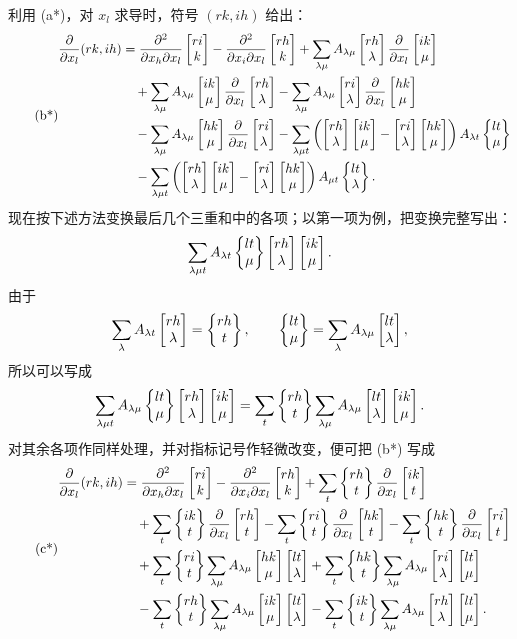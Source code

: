 利用 (a*)，对 \(x_l\) 求导时，符号 \((rk,ih)\) 给出：
\begin{equation}\tag{b*}
\begin{aligned}
\frac{\partial}{\partial x_l}(rk,ih)&=
 \frac{\partial^2}{\partial x_h\partial x_l}\chrsqB{ri}{k}
 -\frac{\partial^2}{\partial x_i\partial x_l}\chrsqB{rh}{k}
 +\sum_{\lambda\mu}A_{\lambda\mu}\chrsqB{rh}{\lambda}\frac{\partial}{\partial x_l}\chrsqB{ik}{\mu}\\
&\quad+\sum_{\lambda\mu}A_{\lambda\mu}\chrsqB{ik}{\mu}\frac{\partial}{\partial x_l}\chrsqB{rh}{\lambda}
 -\sum_{\lambda\mu}A_{\lambda\mu}\chrsqB{ri}{\lambda}\frac{\partial}{\partial x_l}\chrsqB{hk}{\mu}\\
&\quad-\sum_{\lambda\mu}A_{\lambda\mu}\chrsqB{hk}{\mu}\frac{\partial}{\partial x_l}\chrsqB{ri}{\lambda}
 -\sum_{\lambda\mu t}\left(\chrsqB{rh}{\lambda}\chrsqB{ik}{\mu}
 -\chrsqB{ri}{\lambda}\chrsqB{hk}{\mu}\right)A_{\lambda t}\chrB{lt}{\mu}\\
&\quad-\sum_{\lambda\mu t}\left(\chrsqB{rh}{\lambda}\chrsqB{ik}{\mu}
 -\chrsqB{ri}{\lambda}\chrsqB{hk}{\mu}\right)A_{\mu t}\chrB{lt}{\lambda}.
\end{aligned}
\end{equation}
现在按下述方法变换最后几个三重和中的各项；以第一项为例，把变换完整写出：
\[
 \sum_{\lambda\mu t}A_{\lambda t}\chrB{lt}{\mu}\chrsqB{rh}{\lambda}\chrsqB{ik}{\mu}.
\]
由于
\[
 \sum_\lambda A_{\lambda t}\chrsqB{rh}{\lambda}=\chrB{rh}{t},
 \qquad
 \chrB{lt}{\mu}=\sum_\lambda A_{\lambda\mu}\chrsqB{lt}{\lambda},
\]
所以可以写成
\[
 \sum_{\lambda\mu t}A_{\lambda\mu}\chrB{lt}{\mu}\chrsqB{rh}{\lambda}\chrsqB{ik}{\mu}
 =\sum_t\chrB{rh}{t}\sum_{\lambda\mu}A_{\lambda\mu}\chrsqB{lt}{\lambda}\chrsqB{ik}{\mu}.
\]
对其余各项作同样处理，并对指标记号作轻微改变，便可把 (b*) 写成
\begin{equation}\tag{c*}
\begin{aligned}
\frac{\partial}{\partial x_l}(rk,ih)&=
 \frac{\partial^2}{\partial x_h\partial x_l}\chrsqB{ri}{k}
 -\frac{\partial^2}{\partial x_i\partial x_l}\chrsqB{rh}{k}
 +\sum_t\chrB{rh}{t}\frac{\partial}{\partial x_l}\chrsqB{ik}{t}\\
&\quad+\sum_t\chrB{ik}{t}\frac{\partial}{\partial x_l}\chrsqB{rh}{t}
 -\sum_t\chrB{ri}{t}\frac{\partial}{\partial x_l}\chrsqB{hk}{t}
 -\sum_t\chrB{hk}{t}\frac{\partial}{\partial x_l}\chrsqB{ri}{t}\\
&\quad+\sum_t\chrB{ri}{t}\sum_{\lambda\mu}A_{\lambda\mu}\chrsqB{hk}{\mu}\chrsqB{lt}{\lambda}
 +\sum_t\chrB{hk}{t}\sum_{\lambda\mu}A_{\lambda\mu}\chrsqB{ri}{\lambda}\chrsqB{lt}{\mu}\\
&\quad-\sum_t\chrB{rh}{t}\sum_{\lambda\mu}A_{\lambda\mu}\chrsqB{ik}{\mu}\chrsqB{lt}{\lambda}
 -\sum_t\chrB{ik}{t}\sum_{\lambda\mu}A_{\lambda\mu}\chrsqB{rh}{\lambda}\chrsqB{lt}{\mu}.
\end{aligned}
\end{equation}
